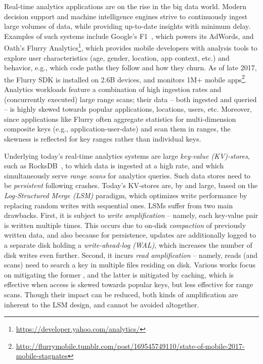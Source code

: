 

Real-time analytics applications are on the rise in the big data world. 
Modern decision support and machine intelligence engines strive to continuously ingest large volumes of data, while providing up-to-date insights with minimum delay. 
Examples of such systems include Google's F1~\cite{Shute2013}, which powers its AdWords, and 
Oath's Flurry Analytics\footnote{\url{https://developer.yahoo.com/analytics/}}, which 
provides mobile developers with analysis tools to explore user characteristics (age, gender, location, app context, etc.) and behavior, e.g., which code paths they follow and how they churn.
As of late 2017, the Flurry SDK is installed on 2.6B devices, and monitors 1M+ mobile apps\footnote{\url{http://flurrymobile.tumblr.com/post/169545749110/state-of-mobile-2017-mobile-stagnates}}. 
Analytics workloads feature a combination of high ingestion rates and (concurrently executed) large range scans; their  
data -- both ingested and queried -- is highly skewed towards popular applications, locations, users, etc. 
Moreover, since applications like Flurry often aggregate statistics for multi-dimension composite keys (e.g., application-user-date)  
and scan them in ranges, the skewness is reflected for key ranges rather than individual keys. 

Underlying today's real-time analytics systems are large \emph{key-value (KV)-stores}, such as RocksDB~\cite{rocks},  
to which data is ingested at a high rate, and which simultaneously serve 
\emph{range scans} for analytics queries. Such data stores need to be \emph{persistent} following crashes.   
Today's KV-stores are, by and large, based on the \emph{Log-Structured Merge (LSM)} paradigm, which 
optimizes write performance by replacing random writes with sequential ones. LSMs suffer from two main drawbacks.
First, it is subject to \emph{write amplification} -- namely, each key-value pair is written multiple times. 
This occurs  due to on-disk \emph{compaction} of previously written data, 
and also because for persistence, updates are additionally logged to a separate disk holding a \emph{write-ahead-log (WAL)}, which increases
the number of disk writes even further.
Second, it incurs \emph{read amplification} -- namely, reads (and scans) need to search a key in multiple files residing on disk. 
Various works focus on mitigating the former , and the latter is mitigated by caching, which is effective
when access is skewed towards popular keys, but less effective for range scans.  
Though their impact can be reduced, both kinds of amplification are inherent to the LSM design, and cannot be avoided altogether. 

